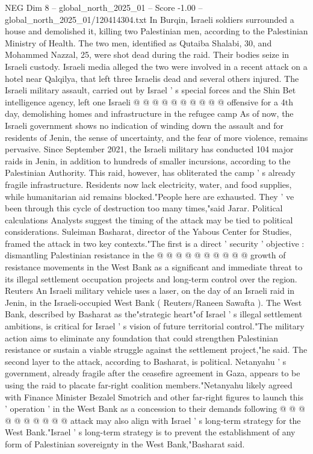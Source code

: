 \begin{textsample}{NEG Dim 8 – global\_north\_2025\_01 – Score -1.00 – global\_north\_2025\_01/120414304.txt}
In Burqin, Israeli soldiers surrounded a house and demolished it, killing two Palestinian men, according to the Palestinian Ministry of Health.
The two men, identified as Qutaiba Shalabi, 30, and Mohammed Nazzal, 25, were shot dead during the raid.
Their bodies seize in Israeli custody.
Israeli media alleged the two were involved in a recent attack on a hotel near Qalqilya, that left three Israelis dead and several others injured.
The Israeli military assault, carried out by Israel ' s special forces and the Shin Bet intelligence agency, left one Israeli @ @ @ @ @ @ @ @ @ @ offensive for a 4th day, demolishing homes and infrastructure in the refugee camp As of now, the Israeli government shows no indication of winding down the assault and for residents of Jenin, the sense of uncertainty, and the fear of more violence, remains pervasive.
Since September 2021, the Israeli military has conducted 104 major raids in Jenin, in addition to hundreds of smaller incursions, according to the Palestinian Authority.
This raid, however, has obliterated the camp ' s already fragile infrastructure.
Residents now lack electricity, water, and food supplies, while humanitarian aid remains blocked."People here are exhausted.
They ' ve been through this cycle of destruction too many times,"said Jarar.
Political calculations Analysts suggest the timing of the attack may be tied to political considerations.
Suleiman Basharat, director of the Yabous Center for Studies, framed the attack in two key contexts."The first is a direct ' security ' objective : dismantling Palestinian resistance in the @ @ @ @ @ @ @ @ @ @ growth of resistance movements in the West Bank as a significant and immediate threat to its illegal settlement occupation projects and long-term control over the region.
Reuters An Israeli military vehicle uses a laser, on the day of an Israeli raid in Jenin, in the Israeli-occupied West Bank ( Reuters/Raneen Sawafta ).
The West Bank, described by Basharat as the"strategic heart"of Israel ' s illegal settlement ambitions, is critical for Israel ' s vision of future territorial control."The military action aims to eliminate any foundation that could strengthen Palestinian resistance or sustain a viable struggle against the settlement project,"he said.
The second layer to the attack, according to Basharat, is political.
Netanyahu ' s government, already fragile after the ceasefire agreement in Gaza, appears to be using the raid to placate far-right coalition members."Netanyahu likely agreed with Finance Minister Bezalel Smotrich and other far-right figures to launch this ' operation ' in the West Bank as a concession to their demands following @ @ @ @ @ @ @ @ @ @ attack may also align with Israel ' s long-term strategy for the West Bank."Israel ' s long-term strategy is to prevent the establishment of any form of Palestinian sovereignty in the West Bank,"Basharat said.

\end{textsample}
